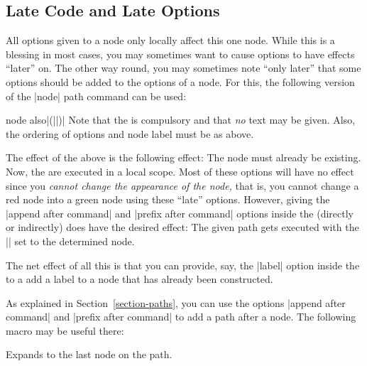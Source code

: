 \subsection{Late Code and Late Options}
\label{section-node-also}

All options given to a node only locally affect this one node. While this is a
blessing in most cases, you may sometimes want to cause options to have effects
``later'' on. The other way round, you may sometimes note ``only later'' that
some options should be added to the options of a node. For this, the following
version of the |node| path command can be used:

\begin{pathoperation}{node also}{|(||)|}
    Note that the  is compulsory and that \emph{no} text may be
    given. Also, the ordering of options and node label must be as above.

    The effect of the above is the following effect: The node  must
    already  be existing. Now, the  are executed in a local
    scope. Most of these options will have no effect since you \emph{cannot
    change the appearance of the node,} that is, you cannot change a red node
    into a green node using these ``late'' options. However, giving the
    |append after command| and |prefix after command| options inside the
     (directly or indirectly) does have the desired effect:
    The given path gets executed with the |\tikzlastnode| set to the determined
    node.

    The net effect of all this is that you can provide, say, the |label| option
    inside the  to a add a label to a node that has already been
    constructed.
\begin{codeexample}[]
\end{codeexample}
\end{pathoperation}

As explained in Section~\ref{section-paths}, you can use the options
|append after command| and |prefix after command| to add a path after a node.
The following macro may be useful there:
%
\begin{command}{\tikzlastnode}
    Expands to the last node on the path.
\end{command}

